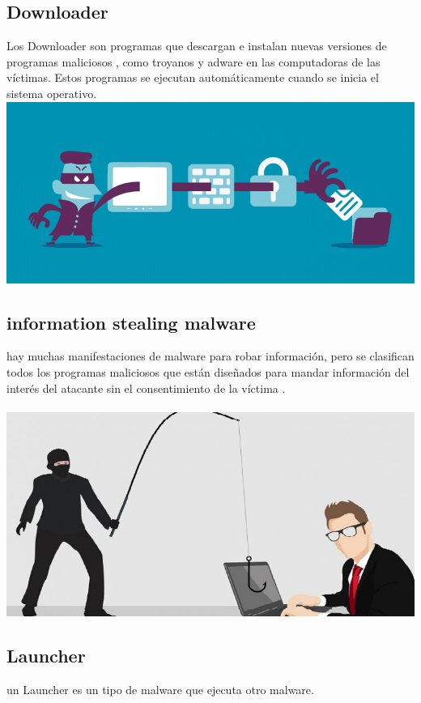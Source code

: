 \documentclass[10pt,a4paper]{article} %
\begin{document}
            \subsection{Downloader}
                Los Downloader son programas que descargan e
                instalan nuevas versiones de programas maliciosos , como
                troyanos y adware en las computadoras de las víctimas. 
                Estos programas se ejecutan automáticamente cuando
                se inicia el sistema operativo.
                \\\includegraphics[width=0.8\linewidth]{downloader.png}
                \\ 

            \subsection{information stealing malware}
                hay muchas manifestaciones de malware para robar información,
                pero se clasifican todos los programas maliciosos que están
                diseñados para mandar información del interés del atacante sin
                el consentimiento de la víctima .
                \\ 
                \\ \includegraphics[width=0.8\linewidth]{information.jpg}
                \\ 

            \subsection{Launcher}
                un Launcher es un tipo de malware que ejecuta otro malware.
\end{document}
